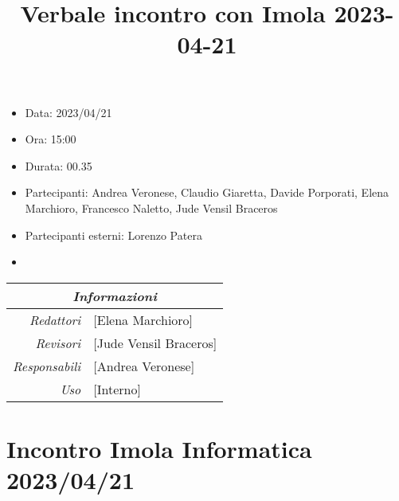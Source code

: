 \documentclass[12pt]{article}
\begin{document}
\graphicspath{ {../../templates/img} }

\title{Verbale incontro con Imola 2023-04-21}
\firstPage
\maketitle

\begin{center}
    \begin{itemize}
        \item[] Data: 2023/04/21
        \item[] Ora: 15:00
        \item[] Durata: 00.35
        \item[] Partecipanti: Andrea Veronese, Claudio Giaretta, Davide Porporati, Elena Marchioro, Francesco Naletto, Jude Vensil Braceros
        \item[] Partecipanti esterni: Lorenzo Patera
        \item[] 
        \end{itemize}
    \begin{tabular}{r | l}
		\multicolumn{2}{c}{\textit{Informazioni}}\\
		\hline
		
			\textit{Redattori} &
			[Elena Marchioro]\makecell{}\\
		
			\textit{Revisori} &
			[Jude Vensil Braceros]\makecell{}\\
			\textit{Responsabili} &
			[Andrea Veronese]\makecell{}\\
		      \textit{Uso} & 
                [Interno]\makecell{}\\
\end{tabular}
\end{center}

\tableofcontents
\printindex
\section{Incontro Imola Informatica 2023/04/21}
\end{document}
